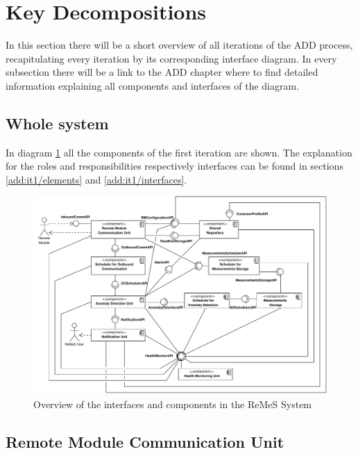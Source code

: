 \section{Key Decompositions}

\npar In this section there will be a short overview of all iterations of the
ADD process, recapitulating every iteration by its corresponding interface
diagram. In every subsection there will be a link to the ADD chapter where to
find detailed information explaining all components and interfaces of the
diagram.

\subsection{Whole system}

\npar In diagram \ref{fig:final-architecture/it1} all the components of the
first iteration are shown. The explanation for the roles and responsibilities
respectively interfaces can be found in sections \ref{add:it1/elements} and
\ref{add:it1/interfaces}.

\begin{figure}[H]
	\begin{centering}
		\includegraphics[width=1.4\textwidth,angle=90]{figs/add-it1-interfaces.pdf}
		\caption{Overview of the interfaces and components in the ReMeS
		System}
		\label{fig:final-architecture/it1}
	\end{centering}
\end{figure}

\subsection{Remote Module Communication Unit}

